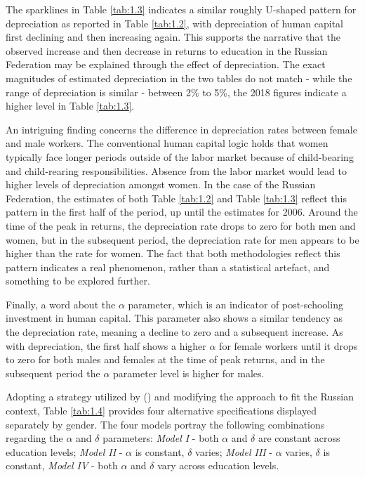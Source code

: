 \documentclass[alpha-refs]{wiley-article-02b}
\begin{document}
\setcounter{table}{3} %

The sparklines in Table \ref{tab:1.3} indicates a similar roughly U-shaped  
pattern for depreciation as reported in Table \ref{tab:1.2}, with 
depreciation of human capital first declining and then increasing again. 
This supports the narrative that the observed increase and then decrease in 
returns to education in the Russian Federation may be explained through the 
effect of depreciation. The  exact magnitudes of estimated depreciation in 
the two tables do not match - while the range of depreciation is similar - 
between 2\% to 5\%, the 2018 figures indicate a higher level in Table 
\ref{tab:1.3}. 

\vspace{3pt}

An intriguing finding concerns the difference in depreciation rates between 
female and male workers. The conventional human capital logic holds that 
women typically face longer periods outside of the labor market because of 
child-bearing and child-rearing responsibilities. Absence from the labor 
market would lead to higher levels of depreciation amongst women. In the 
case of the Russian Federation, the estimates of both Table \ref{tab:1.2} 
and Table \ref{tab:1.3} reflect this pattern in the first half of the 
period, up until the estimates for 2006. Around the time of the peak in 
returns, the depreciation rate drops to zero for both men and women, but in 
the subsequent period, the depreciation rate for men appears to be higher 
than the rate for women. The fact that both methodologies reflect this 
pattern indicates a real phenomenon, rather than a statistical artefact, 
and something to be explored further. 

\vspace{3pt}

Finally, a word about the $\alpha$ parameter, which is an indicator of post-schooling investment in human capital. This parameter also shows a similar tendency as the depreciation rate, meaning a decline to zero and a subsequent  increase. As with depreciation, the first half shows a higher $\alpha$ for female workers until it drops to zero for both males and females at the time of peak returns, and in the subsequent period the $\alpha$ parameter level is higher for males. 

\vspace{3pt}

Adopting a strategy utilized by (\citet{Weber_2008}) and modifying the approach to fit the Russian context, Table \ref{tab:1.4} provides four alternative specifications displayed separately by gender. The four models portray the following combinations regarding the $\alpha$  and $\delta$ parameters: \textit{Model I} - both $\alpha$ and $\delta$ are constant across education levels; \textit{Model II} - $\alpha$ is constant, $\delta$ varies; \textit{Model III} - $\alpha$ varies, $\delta$ is constant, \textit{Model IV} - both $\alpha$ and $\delta$ vary across education levels.
\end{document}
